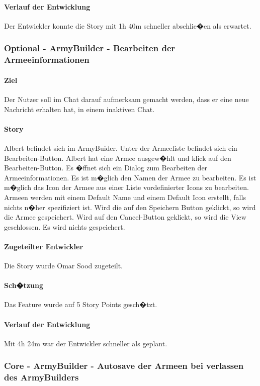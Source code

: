 \documentclass[12pt, titlepage]{scrartcl}
\begin{document}
			\paragraph{Verlauf der Entwicklung} 
			Der Entwickler konnte die Story mit 1h 40m schneller abschlie�en als erwartet.  
			\subsubsection{Optional - ArmyBuilder - Bearbeiten der Armeeinformationen}
			\paragraph{Ziel} Der Nutzer soll im Chat darauf aufmerksam gemacht werden, dass er eine neue Nachricht erhalten hat, in einem inaktiven Chat.
			\paragraph{Story} Albert befindet sich im ArmyBuider. Unter der Armeeliste befindet sich ein Bearbeiten-Button. Albert hat eine Armee ausgew�hlt und klick auf den Bearbeiten-Button. Es �ffnet sich ein Dialog zum Bearbeiten der Armeeinformationen. Es ist m�glich den Namen der Armee zu bearbeiten. Es ist m�glich das Icon der Armee aus einer Liste vordefinierter Icons zu bearbeiten. Armeen werden mit einem Default Name und einem Default Icon erstellt, falls nichts n�her spezifiziert ist. Wird die auf den Speichern Button geklickt, so wird die Armee gespeichert. Wird auf den \glqq Cancel\grqq-Button geklickt, so wird die View geschlossen. Es wird nichts gespeichert.
			\paragraph{Zugeteilter Entwickler} Die Story wurde Omar Sood zugeteilt.
			\paragraph{Sch�tzung}
			Das Feature wurde auf 5 Story Points gesch�tzt.
			\paragraph{Verlauf der Entwicklung} 
			Mit 4h 24m war der Entwickler schneller als geplant.  
			\subsubsection{Core - ArmyBuilder - Autosave der Armeen bei verlassen des ArmyBuilders}
\end{document}
